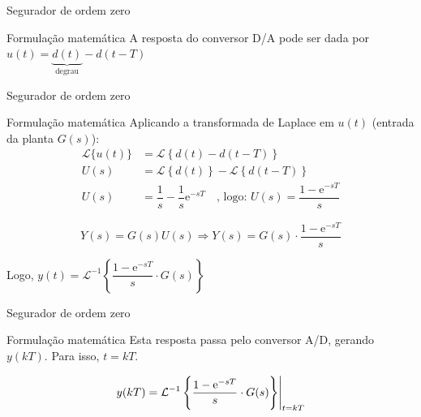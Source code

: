 \begin{frame}{Segurador de ordem zero}
\begin{minipage}{0.45\linewidth}
	\centering
	\scalebox{0.8}{
		}
\end{minipage}
\hfill
\begin{minipage}{0.45\linewidth}
	\centering
	\scalebox{0.8}{
		
		}
\end{minipage}


\begin{block}{Formulação matemática}
	A resposta do conversor D/A pode ser dada por $ u(t)=\underbrace{d(t)}_{\text{degrau}}{}-d(t-T) $
\end{block}
\end{frame}


\begin{frame}{Segurador de ordem zero}
\begin{block}{Formulação matemática}
Aplicando a transformada de Laplace em $ u(t) $ (entrada da planta $ G(s) $):
\begin{align*}
	\mathcal{L}\{u(t)\}&=\mathcal{L}\left\lbrace d(t)-d(t-T)\right\rbrace \\
				 U(s)&=\mathcal{L}\left\lbrace d(t)\right\rbrace -\mathcal{L}\left\lbrace d(t-T)\right\rbrace \\
				 U(s)&=\dfrac{1}{s}-\dfrac{1}{s}\text{e}^{-sT}\quad \text{, logo: }U(s)=\dfrac{1-\text{e}^{-sT}}{s}
\end{align*}

\[ Y(s)=G(s)U(s)\Rightarrow Y(s)=G(s)\cdot\dfrac{1-\text{e}^{-sT}}{s} \]

Logo, $ y(t)=\mathcal{L}^{-1}\left\lbrace \dfrac{1-\text{e}^{-sT}}{s}\cdot G(s)\right\rbrace  $
\end{block}
\end{frame}


\begin{frame}{Segurador de ordem zero}
	\begin{block}{Formulação matemática}
		Esta resposta passa pelo conversor A/D, gerando $  y(kT) $. Para isso, $t=kT$.
		
		\[ y(kT)=\eval{\mathcal{L}^{-1}\left\lbrace\dfrac{1-\text{e}^{-sT}}{s}\cdot G(s) \right\rbrace}_{t=kT}  \]
	\end{block}
\end{frame}


